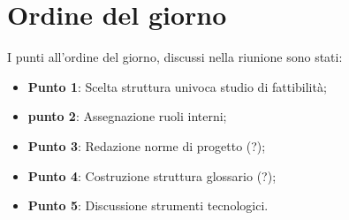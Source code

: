 \section{Ordine del giorno}
I punti all'ordine del giorno, discussi nella riunione sono stati:
\begin{itemize}

	\item \textbf{Punto 1}: Scelta struttura univoca studio di fattibilità;
	\item \textbf{punto 2}: Assegnazione ruoli interni; 
	\item \textbf{Punto 3}: Redazione norme di progetto (?);
	\item \textbf{Punto 4}: Costruzione struttura glossario (?); 
	\item \textbf{Punto 5}: Discussione strumenti tecnologici.
	
\end{itemize}
